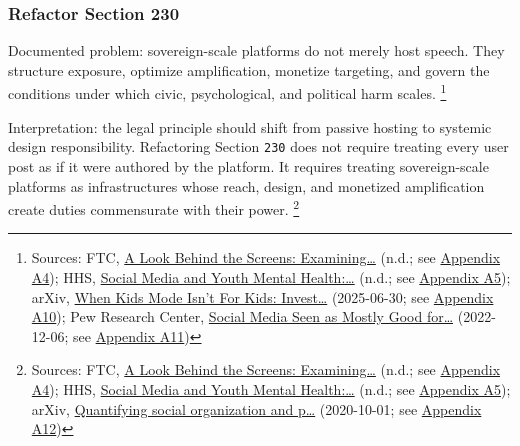 \documentclass[
  american,
  11pt,
  letterpaper,
]{article}
\begin{document}
\subsubsection{Refactor Section 230}\label{refactor-section-230}

Documented problem: sovereign-scale platforms do not merely host speech.
They structure exposure, optimize amplification, monetize targeting, and
govern the conditions under which civic, psychological, and political
harm scales. \footnote{Sources: FTC,
  \href{https://www.ftc.gov/reports/look-behind-screens-examining-data-practices-social-media-video-streaming-services}{A
  Look Behind the Screens: Examining\ldots{}} (n.d.; see
  \hyperref[appendix-a4-a-look-behind-the-screens-examining-the-data-practices-of-social-media-and-video-streaming-services]{Appendix
  A4}); HHS,
  \href{https://www.hhs.gov/surgeongeneral/priorities/youth-mental-health/social-media/index.html}{Social
  Media and Youth Mental Health:\ldots{}} (n.d.; see
  \hyperref[appendix-a5-social-media-and-youth-mental-health-the-u-s-surgeon-general-s-advisory]{Appendix
  A5}); arXiv, \href{https://arxiv.org/abs/2507.00299}{When Kids Mode
  Isn't For Kids: Invest\ldots{}} (2025-06-30; see
  \hyperref[appendix-a10-when-kids-mode-isn-t-for-kids-investigating-tiktok-s-under-13-experience]{Appendix
  A10}); Pew Research Center,
  \href{https://www.pewresearch.org/global/2022/12/06/social-media-seen-as-mostly-good-for-democracy-across-many-nations-but-u-s-is-a-major-outlier/}{Social
  Media Seen as Mostly Good for\ldots{}} (2022-12-06; see
  \hyperref[appendix-a11-social-media-seen-as-mostly-good-for-democracy-across-many-nations-but-u-s-is-a-major-outlier]{Appendix
  A11})}

Interpretation: the legal principle should shift from passive hosting to
systemic design responsibility. Refactoring Section \texttt{230} does
not require treating every user post as if it were authored by the
platform. It requires treating sovereign-scale platforms as
infrastructures whose reach, design, and monetized amplification create
duties commensurate with their power. \footnote{Sources: FTC,
  \href{https://www.ftc.gov/reports/look-behind-screens-examining-data-practices-social-media-video-streaming-services}{A
  Look Behind the Screens: Examining\ldots{}} (n.d.; see
  \hyperref[appendix-a4-a-look-behind-the-screens-examining-the-data-practices-of-social-media-and-video-streaming-services]{Appendix
  A4}); HHS,
  \href{https://www.hhs.gov/surgeongeneral/priorities/youth-mental-health/social-media/index.html}{Social
  Media and Youth Mental Health:\ldots{}} (n.d.; see
  \hyperref[appendix-a5-social-media-and-youth-mental-health-the-u-s-surgeon-general-s-advisory]{Appendix
  A5}); arXiv, \href{https://arxiv.org/abs/2010.00590}{Quantifying
  social organization and p\ldots{}} (2020-10-01; see
  \hyperref[appendix-a12-quantifying-social-organization-and-political-polarization-in-online-platforms]{Appendix
  A12})}
\end{document}
